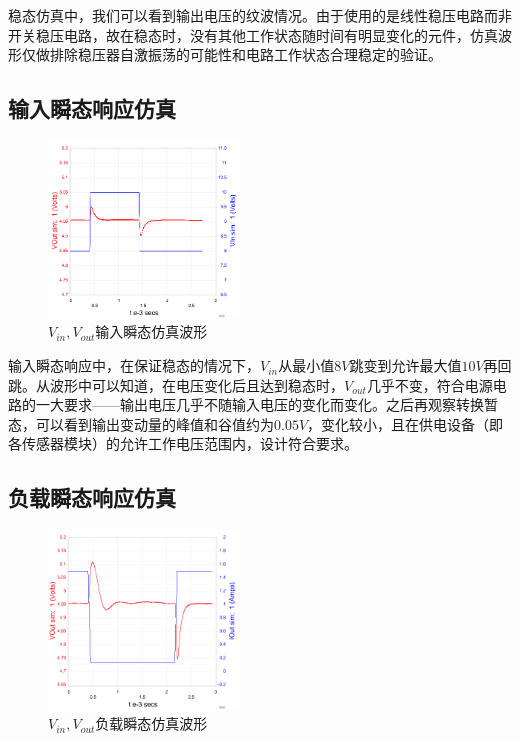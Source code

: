 \documentclass[a4paper, 11pt]{article} %
\begin{document}
稳态仿真中，我们可以看到输出电压的纹波情况。由于使用的是线性稳压电路而非开关稳压电路，故在稳态时，没有其他工作状态随时间有明显变化的元件，仿真波形仅做排除稳压器自激振荡的可能性和电路工作状态合理稳定的验证。

\subsection{输入瞬态响应仿真}

\begin{figure}[H]
    \centering
    \includegraphics[width = 0.45\textwidth]{input_transient.png}
    \caption{$V_{in}, V_{out}$输入瞬态仿真波形}
\end{figure}

输入瞬态响应中，在保证稳态的情况下，$V_{in}$从最小值$8V$跳变到允许最大值$10V$再回跳。从波形中可以知道，在电压变化后且达到稳态时，$V_{out}$几乎不变，符合电源电路的一大要求——输出电压几乎不随输入电压的变化而变化。之后再观察转换暂态，可以看到输出变动量的峰值和谷值约为$0.05V$，变化较小，且在供电设备（即各传感器模块）的允许工作电压范围内，设计符合要求。

\subsection{负载瞬态响应仿真}

\begin{figure}[H]
    \centering
    \includegraphics[width = 0.45\textwidth]{load_transient_sim.png}
    \caption{$V_{in}, V_{out}$负载瞬态仿真波形}
\end{figure}
\end{document}
